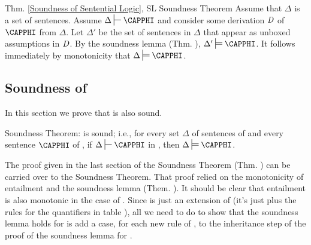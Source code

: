 \begin{PROOFOF}{Thm. \ref{Soundness of Sentential Logic}, SL Soundness Theorem}
Assume that $\Delta$ is a set of \GSL{} sentences. 
Assume $\Delta\sststile{}{}\CAPPHI$ and consider some derivation $\mathit{D}$ of $\CAPPHI$ from $\Delta$. 
Let $\Delta'$ be the set of sentences in $\Delta$ that appear as unboxed assumptions in $\mathit{D}$. 
By the soundness lemma (Thm. ), $\Delta'\sdtstile{}{}\CAPPHI$. 
It follows immediately by monotonicity that $\Delta\sdtstile{}{}\CAPPHI$.  
\end{PROOFOF} 

\subsection{Soundness of \GQD{}}
In this section we prove that \GQD{} is also sound.
\begin{THEOREM}{ \GQD{} Soundness Theorem:}
\GQD{} is sound; i.e., for every set $\Delta$ of sentences of \GQL{} and every sentence $\CAPPHI$ of \GQL{}, if $\Delta\sststile{}{}\CAPPHI$ in \GSD{}, then $\Delta\sdtstile{}{}\CAPPHI$.
\end{THEOREM}
\noindent{}The proof given in the last section of the \GSL{} Soundness Theorem (Thm. ) can be carried over to the \GQL{} Soundness Theorem. 
That proof relied on the monotonicity of entailment and the soundness lemma (Them. ). 
It should be clear that entailment is also monotonic in the case of \GQL{}. 
Since \GQD{} is just an extension of \GSD{} (it's just \GSD{} plus the rules for the quantifiers in table ), all we need to do to show that the soundness lemma holds for \GQD{} is add a case, for each new rule of \GQD{}, to the inheritance step of the proof of the soundness lemma for \GSD{}.
